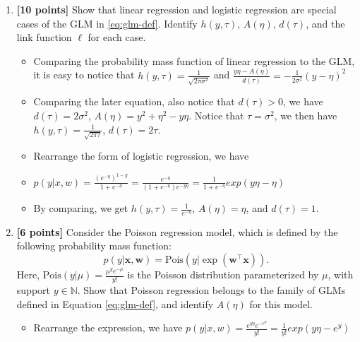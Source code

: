 \documentclass{article}
\begin{document}
\begin{enumerate}
    \item \textbf{[10 points]} Show that linear regression and logistic regression are special cases of the GLM in \eqref{eq:glm-def}. Identify $h(y,\tau)$, $A(\eta)$, $d(\tau)$, and the link function $\ell$ for each case. %
    \begin{itemize}
        \item Comparing the probability mass function of linear regression to the GLM, it is easy to notice that $h(y,\tau)=\frac{1}{\sqrt{2\pi \sigma^2}}$ and $\frac{y\eta-A(\eta)}{d(\tau)}=-\frac{1}{2\sigma^2}(y-\eta)^2$
        \item Comparing the later equation, also notice that $d(\tau) > 0$, we have $d(\tau)=2\sigma^2$, $A(\eta)=y^2+\eta^2-y\eta$. Notice that $\tau=\sigma^2$, we then have $h(y,\tau)=\frac{1}{\sqrt{2\pi\tau}}$, $d(\tau)=2\tau$.
        \item Rearrange the form of logistic regression, we have 
        \item $p(y|x,w)=\frac{(e^{-\eta})^{1-y}}{1+e^{-\eta}}=\frac{e^{-\eta}}{(1+e^{-\eta})e^{-y\eta}}=\frac{1}{1+e^{-\eta}}exp(y\eta - \eta)$
        \item By comparing, we get $h(y,\tau)=\frac{1}{e^{-\eta}}$, $A(\eta)=\eta$, and $d(\tau)=1$.
    \end{itemize}
    \item \label{poisson} \textbf{[6 points]} Consider the Poisson regression model, which is defined by the following probability mass function: \[p(y|\mathbf{x},\mathbf{w})=\text{Pois}(y|\exp(\mathbf{w}^\top\mathbf{x})).\]Here, $\text{Pois}(y|\mu)=\frac{\mu^ye^{-\mu}}{y!}$ is the Poisson distribution parameterized by $\mu$, with support $y\in\mathbb{N}$. Show that Poisson regression belongs to the family of GLMs defined in Equation \eqref{eq:glm-def}, and identify $A(\eta)$ for this model.
    \begin{itemize}
        \item Rearrange the expression, we have $p(y|x,w)=\frac{e^{y\eta} e^{-e^\eta}}{y!}=\frac{1}{y!}exp(y\eta - e^y)$

\end{itemize}
\end{enumerate}
\end{document}
